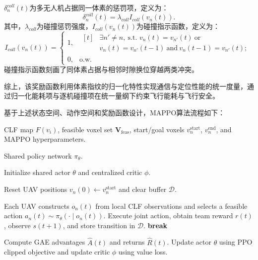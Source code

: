 \documentclass[lettersize,journal]{IEEEtran}
\begin{document}
$\delta_n^{coll}(t)$为多无人机占据同一体素的惩罚项，定义为：
\begin{equation}
\delta_n^{coll}(t)=\lambda_{coll}I_{coll}(v_n(t)).
\end{equation}
其中，$\lambda_{coll}$为碰撞惩罚强度，$I_{coll}(v_n(t))$为碰撞指示函数，定义为：
\begin{equation}
I_{coll}(v_n(t))=
\begin{cases}
1, &\begin{aligned}[t]
&\exists n'\ne n,\ \text{s.t. }v_n(t)=v_{n'}(t)\ \text{or}\\
&v_n(t)=v_{n'}(t-1)\ \text{and}\ v_n(t-1)=v_{n'}(t);
\end{aligned}\\
0, & \text{o.w.}
\end{cases}
\end{equation}
碰撞指示函数刻画了同体素占据与相邻时隙换位穿越两类冲突。

综上，该奖励函数利用体素指纹的归一化特性实现通信与定位性能的统一度量，通过归一化能耗项与逐机碰撞项在统一量纲下约束飞行能耗与飞行安全。

基于上述状态空间、动作空间和奖励函数设计，MAPPO算法流程如下：

\begin{algorithm}[H]
\caption{CLF-Aided Multi-UAV Trajectory Planning via MAPPO}
\label{alg:clf_mappo}
\scriptsize
\begin{algorithmic}

\REQUIRE CLF map $F(v_i)$, feasible voxel set $\mathbf{V}_{\mathrm{feas}}$, 
start/goal voxels $v_n^{\mathrm{start}}$, $v_n^{\mathrm{end}}$, 
and MAPPO hyperparameters.

\ENSURE Shared policy network $\pi_{\theta}$.

\STATE Initialize shared actor $\theta$ and centralized critic $\phi$.

\REPEAT
    \STATE Reset UAV positions $v_n(0)\leftarrow v_n^{\mathrm{start}}$ and clear buffer $\mathcal{D}$.

        \STATE Each UAV constructs $o_n(t)$ from local CLF observations and selects a feasible action
        $a_n(t)\sim\pi_{\theta}(\cdot\mid o_n(t))$.
        \STATE Execute joint action, obtain team reward $r(t)$, observe $s(t+1)$, and store transition in $\mathcal{D}$.
            \STATE \textbf{break}
        \ENDIF
    \ENDFOR

    \STATE Compute GAE advantages $\hat{A}(t)$ and returns $\hat{R}(t)$.
    \STATE Update actor $\theta$ using PPO clipped objective and update critic $\phi$ using value loss.


\end{algorithmic}
\end{algorithm}
\end{document}

